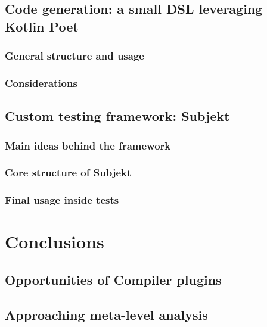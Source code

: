 \documentclass[12pt,a4paper,openright,twoside]{book}
\begin{document}
\section{Code generation: a small DSL leveraging Kotlin Poet}

\subsection{General structure and usage}

\subsection{Considerations}

\section{Custom testing framework: Subjekt}

\subsection{Main ideas behind the framework}

\subsection{Core structure of Subjekt}

\subsection{Final usage inside tests}

\chapter{Conclusions}
\label{chap:conclusion}

\section{Opportunities of Compiler plugins}

\section{Approaching meta-level analysis}
\end{document}
